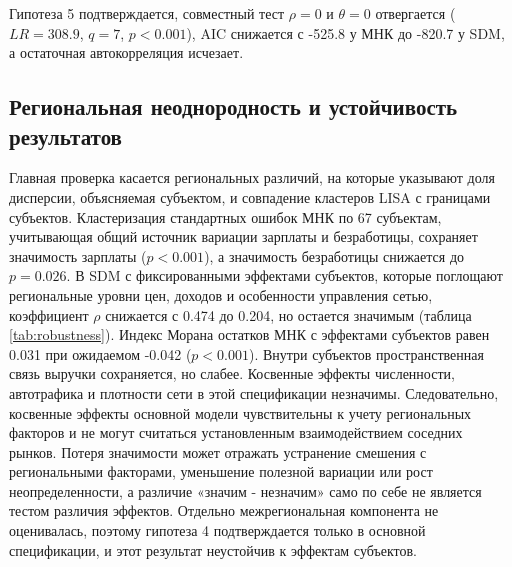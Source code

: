 \documentclass[12pt, a4paper]{article}
\begin{document}
Гипотеза 5 подтверждается, совместный тест $\rho = 0$ и $\theta = 0$ отвергается ($LR = 308.9$,
$q = 7$, $p < 0.001$), AIC снижается с -525.8 у МНК до -820.7 у SDM, а остаточная автокорреляция
исчезает.

\subsection*{Региональная неоднородность и устойчивость результатов}

Главная проверка касается региональных различий, на которые указывают доля дисперсии, объясняемая
субъектом, и совпадение кластеров LISA с границами субъектов. Кластеризация стандартных ошибок МНК
по 67 субъектам, учитывающая общий источник вариации зарплаты и безработицы, сохраняет значимость
зарплаты ($p < 0.001$), а значимость безработицы снижается до $p = 0.026$. В SDM с фиксированными эффектами субъектов, которые
поглощают региональные уровни цен, доходов и особенности управления сетью, коэффициент $\rho$
снижается с 0.474 до 0.204, но остается значимым (таблица \ref{tab:robustness}). Индекс Морана
остатков МНК с эффектами субъектов равен 0.031 при ожидаемом -0.042 ($p < 0.001$). Внутри субъектов
пространственная связь выручки сохраняется, но слабее. Косвенные эффекты численности,
автотрафика и плотности сети в этой спецификации незначимы. Следовательно, косвенные эффекты
основной модели чувствительны к учету региональных факторов и не могут считаться установленным
взаимодействием соседних рынков. Потеря значимости может отражать устранение смешения с
региональными факторами, уменьшение полезной вариации или рост неопределенности, а различие
«значим - незначим» само по себе не является тестом различия эффектов. Отдельно межрегиональная
компонента не оценивалась, поэтому гипотеза 4 подтверждается только в основной спецификации, и
этот результат неустойчив к эффектам субъектов.
\end{document}
